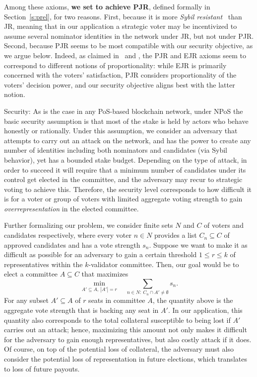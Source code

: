Among these axioms, \textbf{we set to achieve PJR}, defined formally in Section~\ref{s:prel}, for two reasons. 
First, because it is more \emph{Sybil resistant}~\cite{douceur2002sybil} than JR, meaning that in our application a strategic voter may be incentivized to assume several nominator identities in the network under JR, but not under PJR. 
Second, because PJR seems to be most compatible with our security objective, as we argue below. Indeed, as claimed in~\cite{peters2019proportionality} and \cite{lackner2020approval}, the PJR and EJR axioms seem to correspond to different notions of proportionality: while EJR is primarily concerned with the voters' satisfaction, PJR considers proportionality of the voters' decision power, and our security objective aligns best with the latter notion.

Security: 
As is the case in any PoS-based blockchain network, under NPoS the basic security assumption is that most of the stake is held by actors who behave honestly or rationally. Under this assumption, we consider an adversary that attempts to carry out an attack on the network, and has the power to create any number of identities including both nominators and candidates (via Sybil behavior), yet has a bounded stake budget. Depending on the type of attack, in order to succeed it will require that a minimum number of candidates under its control get elected in the committee, and the adversary may recur to strategic voting to achieve this. Therefore, the security level corresponds to how difficult it is for a voter or group of voters with limited aggregate voting strength to gain \emph{overrepresentation} in the elected committee. 

Further formalizing our problem, we consider finite sets $N$ and $C$ of voters and candidates respectively, where every voter $n\in N$ provides a list $C_n\subseteq C$ of approved candidates and has a vote strength $s_n$. 
Suppose we want to make it as difficult as possible for an adversary to gain a certain threshold $1\leq r\leq k$ of representatives within the $k$-validator committee. 
Then, our goal would be to elect a committee $A\subseteq C$ that maximizes 
$$\min_{A'\subseteq A, \  |A'|=r} \quad \sum_{n\in N: \ C_n\cap A'\neq \emptyset} s_n.$$ 
%
For any subset $A'\subseteq A$ of $r$ seats in committee $A$, the quantity above is the aggregate vote strength that is backing any seat in $A'$. In our application, this quantity also corresponds to the total collateral susceptible to being lost if $A'$ carries out an attack; hence, maximizing this amount not only makes it difficult for the adversary to gain enough representatives, but also costly attack if it does. Of course, on top of the potential loss of collateral, the adversary must also consider the potential loss of representation in future elections, which translates to loss of future payouts. %

